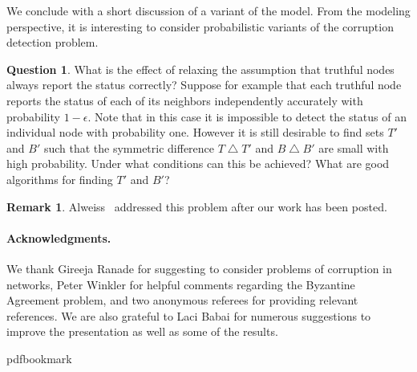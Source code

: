 \documentclass[11pt]{article}
\numberwithin{equation}{section}
\theoremstyle{definition}
\newtheorem{remark}[theorem]{Remark}
\newtheorem{question}[theorem]{Question}
\theoremstyle{plain}
\begin{document}
We conclude with a short discussion of a variant of the model. 
{}From the modeling perspective, it is interesting to consider 
probabilistic variants of the corruption detection problem. 
\begin{question}
What is the effect of relaxing the assumption that truthful nodes
always report the status correctly? Suppose for example that each
truthful node reports the status of each of its neighbors independently
accurately with probability $1-\epsilon$.  Note that in this case it is
impossible to detect the status of an individual node with probability
one. However it is still desirable to find sets $T'$ and $B'$ such that
the symmetric difference $T \bigtriangleup T'$ and $B \bigtriangleup B'$
are small with high probability. Under
what conditions can this be achieved? What are good algorithms for
finding $T'$ and $B'$?
\end{question} 

%
%
%
%
\begin{remark}
Alweiss~\cite{Alweiss:19} addressed this problem
after our work has been posted.
\end{remark}     %

\vspace{0.2cm}

%
%
\paragraph{Acknowledgments.}    %
We thank Gireeja Ranade for suggesting to consider
problems of corruption
%
in   %
networks, Peter Winkler for helpful
comments regarding the Byzantine Agreement problem, and two 
anonymous referees for providing relevant references. We are also 
grateful to Laci Babai for 
numerous suggestions to improve the presentation as well as some of
the results. 
%

%
%
%
%
%

%



\providecommand{\bibhead}[1]{}
\expandafter\ifx\csname pdfbookmark\endcsname\relax%
  \providecommand{\tocrefpdfbookmark}{}
\else\providecommand{\tocrefpdfbookmark}{%
   \hypertarget{tocreferences}{}%
   \pdfbookmark[1]{References}{tocreferences}}%
\fi
\end{document}
